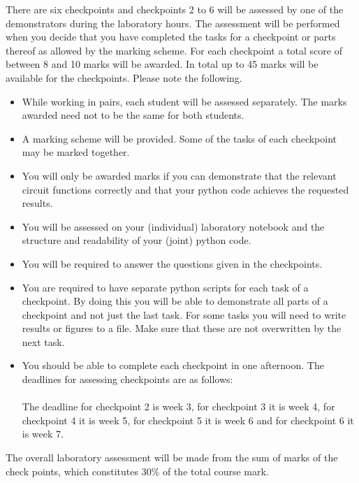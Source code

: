 There are six checkpoints and checkpoints 2 to 6 will be assessed by one of the demonstrators during the laboratory hours. 
The assessment will be performed when you decide that you have completed the tasks for a checkpoint or parts thereof as allowed by the marking scheme. For each checkpoint a total score of between 8 and 10 marks will be awarded.  In total up to 45 marks will be available for the checkpoints.
Please note the following. 
\begin{itemize}

\item While working in pairs, each student will be assessed separately. The marks awarded need not to be the same for both students. 

\item A marking scheme will be provided. Some of the tasks of each checkpoint may be marked together.

\item You will only be awarded marks if you can demonstrate that the relevant circuit functions correctly and that your python code achieves the requested results. 

\item You will be assessed on your (individual) laboratory notebook and  the structure and readability of your (joint) python code.

\item You will be required to answer the questions given in the checkpoints.

\item  You are required to have separate python scripts for each task of a checkpoint. By doing this you will be able  to demonstrate all parts of a checkpoint and not just the last task. For some tasks you will need to write results or figures to a file. Make sure that these are not overwritten by the next task.

\item You should be able to complete each checkpoint  in one afternoon. The deadlines for assessing checkpoints are as follows:\\
%
\\The deadline for checkpoint 2 is week 3,  for checkpoint 3 it is week 4, for checkpoint 4 it is week 5,  for checkpoint 5 it is week 6 and for checkpoint 6 it is week 7.
\end{itemize}
The overall laboratory assessment will be made from the sum of marks of the check points, which constitutes 30\% of the total course mark.


